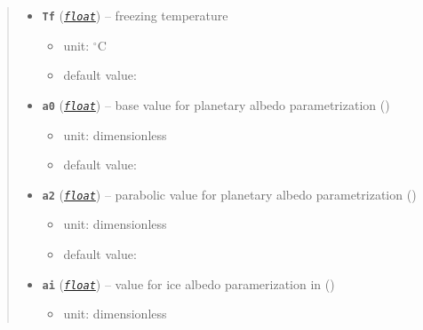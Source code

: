 \documentclass[a4paper,10pt,english]{sphinxmanual}
\begin{document}
\begin{fulllineitems}
\begin{quote}
\begin{description}
\begin{itemize}
\item {} 
\textbf{\texttt{Tf}} (\href{http://docs.python.org/2.7/library/functions.html\#float}{\emph{\texttt{float}}}) -- 
freezing temperature
\begin{itemize}
\item {} 
unit: \(^{\circ} \textrm{C}\)

\item {} 
default value: 

\end{itemize}


\item {} 
\textbf{\texttt{a0}} (\href{http://docs.python.org/2.7/library/functions.html\#float}{\emph{\texttt{float}}}) -- 
base value for planetary albedo parametrization
{\hyperref[api/climlab.surface:climlab.surface.albedo.StepFunctionAlbedo]{\emph{}}} ()
\begin{itemize}
\item {} 
unit: dimensionless

\item {} 
default value: 

\end{itemize}


\item {} 
\textbf{\texttt{a2}} (\href{http://docs.python.org/2.7/library/functions.html\#float}{\emph{\texttt{float}}}) -- 
parabolic value for planetary  albedo parametrization
{\hyperref[api/climlab.surface:climlab.surface.albedo.StepFunctionAlbedo]{\emph{}}} ()
\begin{itemize}
\item {} 
unit: dimensionless

\item {} 
default value: 

\end{itemize}


\item {} 
\textbf{\texttt{ai}} (\href{http://docs.python.org/2.7/library/functions.html\#float}{\emph{\texttt{float}}}) -- 
value for ice albedo paramerization in
{\hyperref[api/climlab.surface:climlab.surface.albedo.StepFunctionAlbedo]{\emph{}}} ()
\begin{itemize}
\item {} 
unit: dimensionless


\end{itemize}
\end{itemize}
\end{description}
\end{quote}
\end{fulllineitems}
\end{document}
